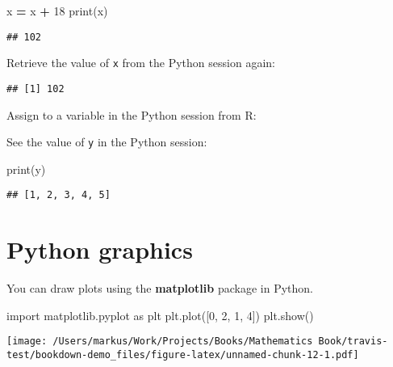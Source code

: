 \documentclass[
]{book}
\newenvironment{Shaded}{\begin{snugshade}}{\end{snugshade}}
\newcommand{\BuiltInTok}[1]{#1}
\newcommand{\DecValTok}[1]{\textcolor[rgb]{0.00,0.00,0.81}{#1}}
\newcommand{\ImportTok}[1]{#1}
\newcommand{\NormalTok}[1]{#1}
\newcommand{\OperatorTok}[1]{\textcolor[rgb]{0.81,0.36,0.00}{\textbf{#1}}}
\newcommand{\StringTok}[1]{\textcolor[rgb]{0.31,0.60,0.02}{#1}}
\begin{document}
\begin{Shaded}
\begin{Highlighting}[]
\NormalTok{x }\OperatorTok{=}\NormalTok{ x }\OperatorTok{+} \DecValTok{18} 
\BuiltInTok{print}\NormalTok{(x)}
\end{Highlighting}
\end{Shaded}

\begin{verbatim}
## 102
\end{verbatim}

Retrieve the value of \texttt{x} from the Python session again:

\begin{Shaded}
\end{Shaded}

\begin{verbatim}
## [1] 102
\end{verbatim}

Assign to a variable in the Python session from R:

\begin{Shaded}
\end{Shaded}

See the value of \texttt{y} in the Python session:

\begin{Shaded}
\begin{Highlighting}[]
\BuiltInTok{print}\NormalTok{(y)}
\end{Highlighting}
\end{Shaded}

\begin{verbatim}
## [1, 2, 3, 4, 5]
\end{verbatim}

\hypertarget{python-graphics}{%
\section{Python graphics}\label{python-graphics}}

You can draw plots using the \textbf{matplotlib} package in Python.

\begin{Shaded}
\begin{Highlighting}[]
\ImportTok{import}\NormalTok{ matplotlib.pyplot }\ImportTok{as}\NormalTok{ plt}
\NormalTok{plt.plot([}\DecValTok{0}\NormalTok{, }\DecValTok{2}\NormalTok{, }\DecValTok{1}\NormalTok{, }\DecValTok{4}\NormalTok{])}
\NormalTok{plt.show()}
\end{Highlighting}
\end{Shaded}

\texttt{[image: /Users/markus/Work/Projects/Books/Mathematics Book/travis-test/bookdown-demo\_files/figure-latex/unnamed-chunk-12-1.pdf]}

  
\end{document}
